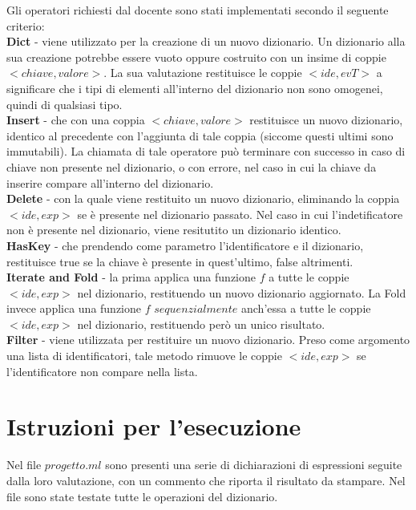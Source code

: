 \documentclass{article}
\begin{document}
Gli operatori richiesti dal docente sono stati implementati secondo il seguente criterio:\\
\textbf{Dict} - viene utilizzato per la creazione di un nuovo dizionario. Un dizionario alla sua creazione potrebbe essere vuoto oppure costruito con un insime di coppie $<chiave,valore>$. La sua valutazione restituisce le coppie $<ide,evT>$ a significare che i tipi di elementi all'interno del dizionario non sono omogenei, quindi di qualsiasi tipo.\\
\textbf{Insert} - che con una coppia $<chiave,valore>$ restituisce un nuovo dizionario, identico al precedente con l'aggiunta di tale coppia  (siccome questi ultimi sono immutabili). La chiamata di tale operatore può terminare con successo in caso di chiave non presente nel dizionario, o con errore, nel caso in cui la chiave da inserire compare all'interno del dizionario.\\
\textbf{Delete} - con la quale viene restituito un nuovo dizionario, eliminando la coppia $<ide,exp>$ se è presente nel dizionario passato. Nel caso in cui l'indetificatore non è presente nel dizionario, viene resitutito un dizionario identico.\\
\textbf{HasKey} - che prendendo come parametro l'identificatore e il dizionario, restituisce true se la chiave è presente in quest'ultimo, false altrimenti.\\
\textbf{Iterate and Fold} - la prima applica una funzione $f$ a tutte le coppie $<ide,exp>$ nel dizionario, restituendo un nuovo dizionario aggiornato. La Fold invece applica una funzione $f$ $sequenzialmente$ anch'essa a tutte le coppie $<ide,exp>$ nel dizionario, restituendo però un unico risultato.\\
\textbf{Filter} - viene utilizzata per restituire un nuovo dizionario. Preso come argomento una lista di identificatori, tale metodo rimuove le coppie $<ide,exp>$ se l'identificatore non compare nella lista.
\section{Istruzioni per l'esecuzione}
Nel file $progetto.ml$ sono presenti una serie di dichiarazioni di espressioni seguite dalla loro valutazione, con un commento che riporta il risultato da stampare. Nel file sono state testate tutte le operazioni del dizionario.
\end{document}
